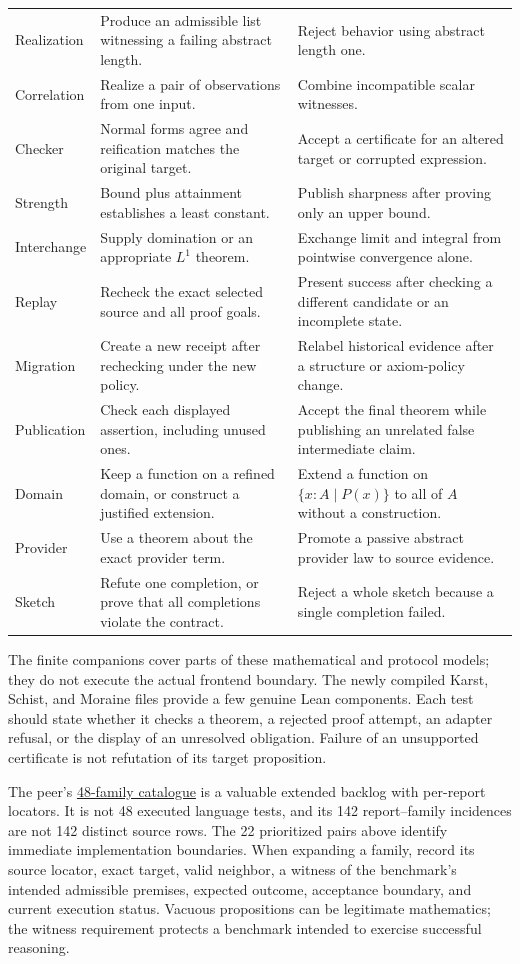 \documentclass[11pt,letterpaper]{article}
\newcommand{\code}[1]{\texttt{\detokenize{#1}}}
\theoremstyle{definition}\newtheorem{definition}[proposition]{Definition}
\theoremstyle{remark}\newtheorem{remark}[proposition]{Remark}
\begin{document}
\begin{center}
\begin{longtable}{@{}P{0.12\textwidth}P{0.38\textwidth}P{0.40\textwidth}@{}}
Realization & Produce an admissible list witnessing a failing abstract length. & Reject \code{List Empty} behavior using abstract length one.\\
Correlation & Realize a pair of observations from one input. & Combine incompatible scalar witnesses.\\
Checker & Normal forms agree and reification matches the original target. & Accept a certificate for an altered target or corrupted expression.\\
Strength & Bound plus attainment establishes a least constant. & Publish sharpness after proving only an upper bound.\\
Interchange & Supply domination or an appropriate $L^1$ theorem. & Exchange limit and integral from pointwise convergence alone.\\
Replay & Recheck the exact selected source and all proof goals. & Present success after checking a different candidate or an incomplete state.\\
Migration & Create a new receipt after rechecking under the new policy. & Relabel historical evidence after a structure or axiom-policy change.\\
Publication & Check each displayed assertion, including unused ones. & Accept the final theorem while publishing an unrelated false intermediate claim.\\
Domain & Keep a function on a refined domain, or construct a justified extension. & Extend a function on $\{x:A\mid P(x)\}$ to all of $A$ without a construction.\\
Provider & Use a theorem about the exact provider term. & Promote a passive abstract provider law to source evidence.\\
Sketch & Refute one completion, or prove that all completions violate the contract. & Reject a whole sketch because a single completion failed.\\
\end{longtable}
\end{center}

The finite companions cover parts of these mathematical and protocol models;
they do not execute the actual frontend boundary. The newly compiled Karst,
Schist, and Moraine files provide a few genuine Lean components. Each test
should state whether it checks a theorem, a rejected proof attempt, an adapter
refusal, or the display of an unresolved obligation. Failure of an unsupported
certificate is not refutation of its target proposition.

The peer's \href{../unified_report/negative_suite.csv}{48-family catalogue}
is a valuable extended backlog with per-report locators. It is not 48 executed
language tests, and its 142 report--family incidences are not 142 distinct
source rows. The 22 prioritized pairs above identify immediate implementation
boundaries. When expanding a family, record its source locator, exact target,
valid neighbor, a witness of the benchmark's intended admissible premises,
expected outcome, acceptance boundary, and current execution status.
Vacuous propositions can be legitimate mathematics; the witness requirement
protects a benchmark intended to exercise successful reasoning.
\end{document}
